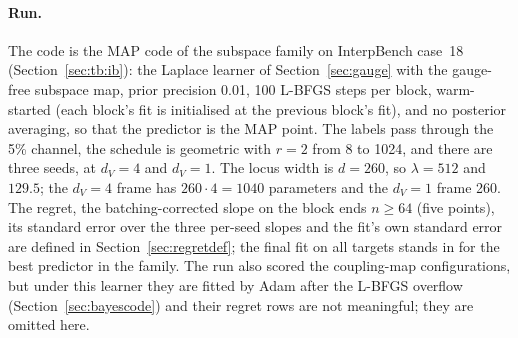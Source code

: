\documentclass[11pt,a4paper]{article}
\newcommand{\dv}{d_V}
\begin{document}
\paragraph{Run.} The code is the MAP code of the subspace family on InterpBench case~18 (Section~\ref{sec:tb:ib}): the Laplace learner of Section~\ref{sec:gauge} with the gauge-free subspace map, prior precision 0.01, 100 L-BFGS steps per block, warm-started (each block's fit is initialised at the previous block's fit), and no posterior averaging, so that the predictor is the MAP point. The labels pass through the 5\% channel, the schedule is geometric with $r=2$ from 8 to 1024, and there are three seeds, at $\dv=4$ and $\dv=1$. The locus width is $d=260$, so $\lambda=512$ and $129.5$; the $\dv=4$ frame has $260\cdot4=1040$ parameters and the $\dv=1$ frame 260. The regret, the batching-corrected slope on the block ends $n\ge64$ (five points), its standard error over the three per-seed slopes and the fit's own standard error are defined in Section~\ref{sec:regretdef}; the final fit on all targets stands in for the best predictor in the family. The run also scored the coupling-map configurations, but under this learner they are fitted by Adam after the L-BFGS overflow (Section~\ref{sec:bayescode}) and their regret rows are not meaningful; they are omitted here.
\end{document}
